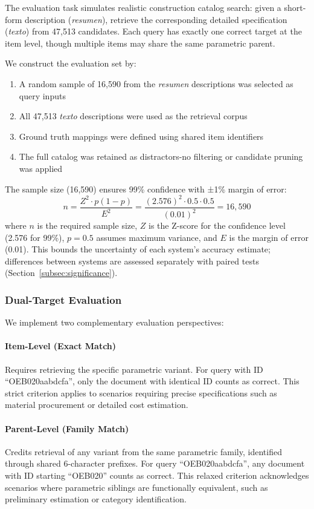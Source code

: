 \documentclass[preprint,review,12pt]{elsarticle}
\begin{document}
The evaluation task simulates realistic construction catalog search: given a short-form description (\textit{resumen}), retrieve the corresponding detailed specification (\textit{texto}) from 47,513 candidates. Each query has exactly one correct target at the item level, though multiple items may share the same parametric parent.

We construct the evaluation set by:
\begin{enumerate}
    \item A random sample of 16,590 from the \textit{resumen} descriptions was selected as query inputs
    \item All 47,513 \textit{texto} descriptions were used as the retrieval corpus
    \item Ground truth mappings were defined using shared item identifiers
    \item The full catalog was retained as distractors-no filtering or candidate pruning was applied
\end{enumerate}

The sample size (16,590) ensures 99\% confidence with ±1\% margin of error:
\[
n = \frac{Z^2 \cdot p(1 - p)}{E^2} = \frac{(2.576)^2 \cdot 0.5 \cdot 0.5}{(0.01)^2} = 16{,}590
\]
where $n$ is the required sample size, $Z$ is the Z-score for the confidence level (2.576 for 99\%), $p = 0.5$ assumes maximum variance, and $E$ is the margin of error (0.01). This bounds the uncertainty of each system's accuracy estimate; differences between systems are assessed separately with paired tests (Section~\ref{subsec:significance}).

\subsubsection{Dual-Target Evaluation}

We implement two complementary evaluation perspectives:

\paragraph{Item-Level (Exact Match)}
Requires retrieving the specific parametric variant. For query with ID ``OEB020aabdcfa'', only the document with identical ID counts as correct. This strict criterion applies to scenarios requiring precise specifications such as material procurement or detailed cost estimation.

\paragraph{Parent-Level (Family Match)}
Credits retrieval of any variant from the same parametric family, identified through shared 6-character prefixes. For query ``OEB020aabdcfa'', any document with ID starting ``OEB020'' counts as correct. This relaxed criterion acknowledges scenarios where parametric siblings are functionally equivalent, such as preliminary estimation or category identification.
\end{document}
